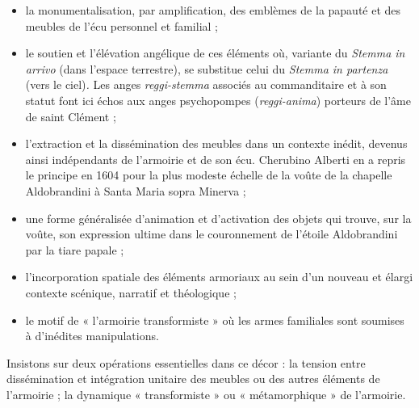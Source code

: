 \documentclass[12pt,twoside,openany]{book}
\begin{document}
\begin{itemize}[leftmargin=*]
\item la monumentalisation, par amplification, des emblèmes de la papauté et des meubles de l’écu personnel et familial ;
\item le soutien et l’élévation angélique de ces éléments où, variante du \textit{Stemma in arrivo} (dans l’espace terrestre), se substitue celui du \textit{Stemma in partenza} (vers le ciel)\textit{. }Les anges \textit{reggi-stemma }associés au commanditaire et à son statut font ici échos aux anges psychopompes (\textit{reggi-anima}) porteurs de l’âme de saint Clément ;
\item l’extraction et la dissémination des meubles dans un contexte inédit, devenus ainsi indépendants de l’armoirie et de son écu. Cherubino Alberti en a repris le principe en 1604 pour la plus modeste échelle de la voûte de la chapelle Aldobrandini à Santa Maria sopra Minerva ;
\item une forme généralisée d’animation et d’activation des objets qui trouve, sur la voûte, son expression ultime dans le couronnement de l’étoile Aldobrandini par la tiare papale ;
\item l’incorporation spatiale des éléments armoriaux au sein d’un nouveau et élargi contexte scénique, narratif et théologique ;
\item le motif de « l’armoirie transformiste » où les armes familiales sont soumises à d’inédites manipulations.
\end{itemize}

Insistons sur deux opérations essentielles dans ce décor : la tension entre dissémination et intégration unitaire des meubles ou des autres éléments de l’armoirie ; la dynamique « transformiste » ou « métamorphique » de l’armoirie.
\end{document}
